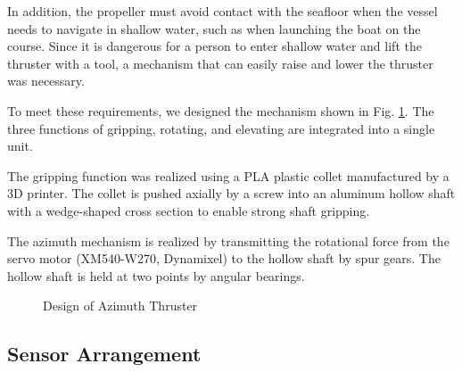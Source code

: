 \documentclass[lettersize,journal]{IEEEtran}
\begin{document}
In addition, the propeller must avoid contact with the seafloor when the vessel needs to navigate in shallow water, such as when launching the boat on the course. Since it is dangerous for a person to enter shallow water and lift the thruster with a tool, a mechanism that can easily raise and lower the thruster was necessary.

To meet these requirements, we designed the mechanism shown in Fig. \ref{fig:azimuth_design}.
The three functions of gripping, rotating, and elevating are integrated into a single unit.

The gripping function was realized using a PLA plastic collet manufactured by a 3D printer.
The collet is pushed axially by a screw into an aluminum hollow shaft with a wedge-shaped cross section to enable strong shaft gripping.

The azimuth mechanism is realized by transmitting the rotational force from the servo motor (XM540-W270, Dynamixel) to the hollow shaft by spur gears.
The hollow shaft is held at two points by angular bearings.

\begin{figure}[H]
  \begin{center}
  \end{center}
  \caption{Design of Azimuth Thruster}
  \label{fig:azimuth_design}
\end{figure}

\subsection{Sensor Arrangement}
\end{document}
